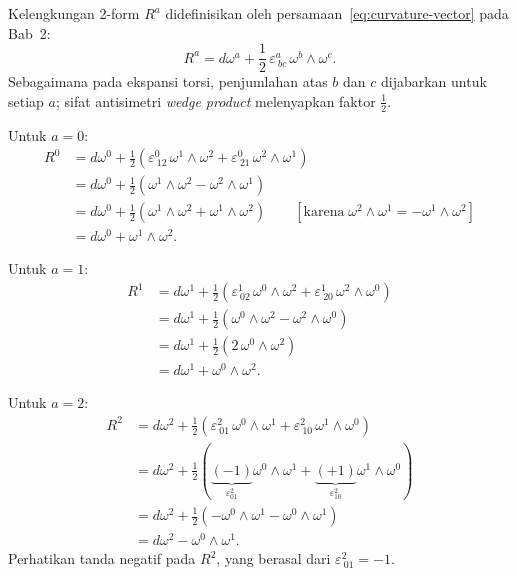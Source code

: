 Kelengkungan 2-form $R^a$ didefinisikan oleh persamaan~\eqref{eq:curvature-vector} pada Bab~2:
\begin{equation}
    R^a = d\omega^a + \frac{1}{2}\,\varepsilon^{a}_{\ bc}\,\omega^b \wedge \omega^c. \label{b42-eq:curvature-def}
\end{equation}
Sebagaimana pada ekspansi torsi, penjumlahan atas $b$ dan $c$ dijabarkan untuk setiap $a$; sifat antisimetri \emph{wedge product} melenyapkan faktor $\frac{1}{2}$.

\noindent Untuk $a = 0$:
\begin{align}
    R^0 &= d\omega^0 + \frac{1}{2}\!\left(\varepsilon^{0}_{\ 12}\,\omega^1 \wedge \omega^2 + \varepsilon^{0}_{\ 21}\,\omega^2 \wedge \omega^1\right) \nonumber\\[4pt]
    &= d\omega^0 + \frac{1}{2}\!\left(\omega^1 \wedge \omega^2 - \omega^2 \wedge \omega^1\right) \nonumber\\[4pt]
    &= d\omega^0 + \frac{1}{2}\!\left(\omega^1 \wedge \omega^2 + \omega^1 \wedge \omega^2\right) \qquad [\text{karena}\;\omega^2 \wedge \omega^1 = -\omega^1 \wedge \omega^2] \nonumber\\[4pt]
    &= d\omega^0 + \omega^1 \wedge \omega^2. \label{b42-eq:R0}
\end{align}

\noindent Untuk $a = 1$:
\begin{align}
    R^1 &= d\omega^1 + \frac{1}{2}\!\left(\varepsilon^{1}_{\ 02}\,\omega^0 \wedge \omega^2 + \varepsilon^{1}_{\ 20}\,\omega^2 \wedge \omega^0\right) \nonumber\\[4pt]
    &= d\omega^1 + \frac{1}{2}\!\left(\omega^0 \wedge \omega^2 - \omega^2 \wedge \omega^0\right) \nonumber\\[4pt]
    &= d\omega^1 + \frac{1}{2}\!\left(2\,\omega^0 \wedge \omega^2\right) \nonumber\\[4pt]
    &= d\omega^1 + \omega^0 \wedge \omega^2. \label{b42-eq:R1}
\end{align}

\noindent Untuk $a = 2$:
\begin{align}
    R^2 &= d\omega^2 + \frac{1}{2}\!\left(\varepsilon^{2}_{\ 01}\,\omega^0 \wedge \omega^1 + \varepsilon^{2}_{\ 10}\,\omega^1 \wedge \omega^0\right) \nonumber\\[4pt]
    &= d\omega^2 + \frac{1}{2}\!\left(\underbrace{(-1)}_{\varepsilon^2_{01}}\omega^0 \wedge \omega^1 + \underbrace{(+1)}_{\varepsilon^2_{10}}\omega^1 \wedge \omega^0\right) \nonumber\\[4pt]
    &= d\omega^2 + \frac{1}{2}\!\left(-\omega^0 \wedge \omega^1 - \omega^0 \wedge \omega^1\right) \nonumber\\[4pt]
    &= d\omega^2 - \omega^0 \wedge \omega^1. \label{b42-eq:R2}
\end{align}
Perhatikan tanda negatif pada $R^2$, yang berasal dari $\varepsilon^{2}_{\ 01} = -1$.

